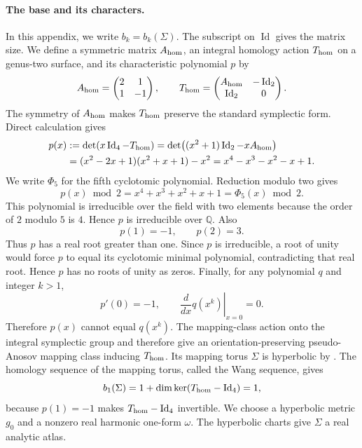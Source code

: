 \documentclass[11pt,letterpaper,reqno]{amsart}
\theoremstyle{remark}
\newcommand{\Id}{\operatorname{Id}}
\begin{document}
\paragraph{The base and its characters.}
In this appendix, we write $b_k=b_k(\Sigma)$.
The subscript on $\Id$ gives the matrix size.
We define a symmetric matrix $A_{\rm hom}$, an integral homology action $T_{\rm hom}$
on a genus-two surface, and its characteristic polynomial $p$ by
\[
 A_{\rm hom}=\begin{pmatrix}2&1\\1&-1\end{pmatrix},\qquad
 T_{\rm hom}=\begin{pmatrix}A_{\rm hom}&-\Id_2\\\Id_2&0\end{pmatrix}.
\]
The symmetry of $A_{\rm hom}$ makes $T_{\rm hom}$ preserve the standard
symplectic form. Direct calculation gives
\[
 \begin{aligned}
 p(x)&:=\det(x\Id_4-T_{\rm hom})
 =\det\bigl((x^2+1)\Id_2-xA_{\rm hom}\bigr)\\
 &=(x^2-2x+1)(x^2+x+1)-x^2
 =x^4-x^3-x^2-x+1.
 \end{aligned}
\]
We write $\Phi_5$ for the fifth cyclotomic polynomial. Reduction modulo
two gives
\[
 p(x)\bmod2=x^4+x^3+x^2+x+1=\Phi_5(x)\bmod2.
\]
This polynomial is irreducible over the field with two elements because
the order of $2$ modulo $5$ is $4$. Hence $p$ is irreducible over
$\mathbb Q$. Also
\[
 p(1)=-1,\qquad p(2)=3.
\]
Thus $p$ has a real root greater than one. Since $p$ is irreducible,
a root of unity would force $p$ to equal its cyclotomic minimal polynomial,
contradicting that real root. Hence $p$ has no roots of unity as zeros.
Finally, for any polynomial
$q$ and integer $k>1$,
\[
 p'(0)=-1,\qquad
 \left.\frac{d}{dx}q(x^k)\right|_{x=0}=0.
\]
Therefore $p(x)$ cannot equal $q(x^k)$.
The mapping-class action onto the integral symplectic group and
\cite[Proposition~1]{MS} therefore give an orientation-preserving
pseudo-Anosov mapping class inducing $T_{\rm hom}$.
Its mapping torus $\Sigma$ is hyperbolic by \cite{Thurston}.
The homology sequence of the mapping torus, called the Wang sequence, gives
\[
 b_1(\Sigma)=1+\dim\ker(T_{\rm hom}-\Id_4)=1,
\]
because $p(1)=-1$ makes $T_{\rm hom}-\Id_4$ invertible.
We choose a hyperbolic metric $g_0$ and a nonzero real harmonic
one-form $\omega$.
The hyperbolic charts give $\Sigma$ a real analytic atlas.
\end{document}
